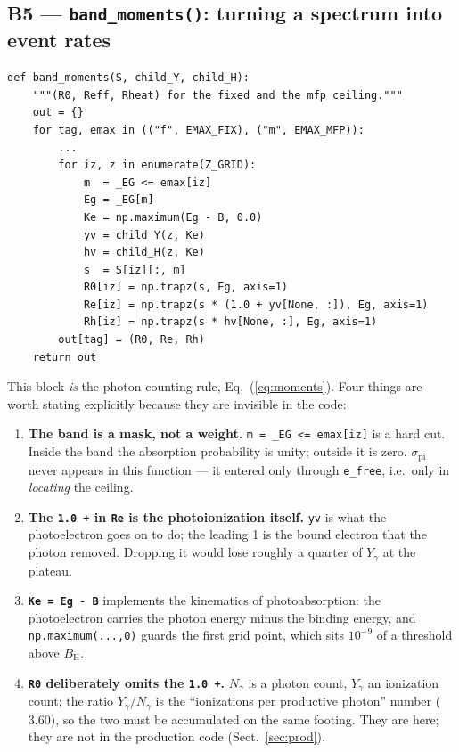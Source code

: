 \documentclass[11pt,a4paper]{article}
\newcommand{\code}[1]{\texttt{\small #1}}
\newcommand{\BH}{B_{\mathrm{H}}}
\newcommand{\spi}{\sigma_{\mathrm{pi}}}
\begin{document}
\subsection*{B5 --- \code{band\_moments()}: turning a spectrum into event rates}

\begin{lstlisting}
def band_moments(S, child_Y, child_H):
    """(R0, Reff, Rheat) for the fixed and the mfp ceiling."""
    out = {}
    for tag, emax in (("f", EMAX_FIX), ("m", EMAX_MFP)):
        ...
        for iz, z in enumerate(Z_GRID):
            m  = _EG <= emax[iz]
            Eg = _EG[m]
            Ke = np.maximum(Eg - B, 0.0)
            yv = child_Y(z, Ke)
            hv = child_H(z, Ke)
            s  = S[iz][:, m]
            R0[iz] = np.trapz(s, Eg, axis=1)
            Re[iz] = np.trapz(s * (1.0 + yv[None, :]), Eg, axis=1)
            Rh[iz] = np.trapz(s * hv[None, :], Eg, axis=1)
        out[tag] = (R0, Re, Rh)
    return out
\end{lstlisting}

This block \emph{is} the photon counting rule, Eq.~(\ref{eq:moments}).  Four
things are worth stating explicitly because they are invisible in the code:

\begin{enumerate}[leftmargin=1.6em]
\item \textbf{The band is a mask, not a weight.}  \code{m = \_EG <= emax[iz]}
      is a hard cut.  Inside the band the absorption probability is unity;
      outside it is zero.  $\spi$ never appears in this function --- it entered
      only through \code{e\_free}, i.e.\ only in \emph{locating} the ceiling.
\item \textbf{The \code{1.0 +} in \code{Re} is the photoionization itself.}
      \code{yv} is what the photoelectron goes on to do; the leading 1 is the
      bound electron that the photon removed.  Dropping it would lose roughly
      a quarter of $Y_\gamma$ at the plateau.
\item \textbf{\code{Ke = Eg - B}} implements the kinematics of photoabsorption:
      the photoelectron carries the photon energy minus the binding energy,
      and \code{np.maximum(...,0)} guards the first grid point, which sits
      $10^{-9}$ of a threshold above $\BH$.
\item \textbf{\code{R0} deliberately omits the \code{1.0 +}.}  $N_\gamma$ is a
      photon count, $Y_\gamma$ an ionization count; the ratio
      $Y_\gamma/N_\gamma$ is the ``ionizations per productive photon'' number
      ($3.60$), so the two must be accumulated on the same footing.  They are
      here; they are not in the production code (Sect.~\ref{sec:prod}).
\end{enumerate}
\end{document}
